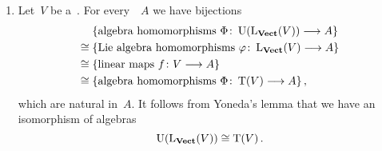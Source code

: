 \begin{example}
	\leavevmode
	\begin{enumerate}
		\item
			Let~$V$ be a~\vectorspace{$\kf$}.
			For every~\algebra{$\kf$}~$A$ we have bijections
			\begin{align*}
				{}&
				\{
					\text{algebra homomorphisms~$\Phi \colon \Univ(\freelievect(V)) \to A$}
				\}
				\\
				\cong{}&
				\{
					\text{Lie~algebra homomorphisms~$\varphi \colon \freelievect(V) \to A$}
				\}
				\\
				\cong{}&
				\{
					\text{linear maps~$f \colon V \to A$}
				\}
				\\
				\cong{}&
				\{
					\text{algebra homomorphisms~$\Phi \colon \Tensor(V) \to A$}
				\} \,,
			\end{align*}
			which are natural in~$A$.
			It follows from Yoneda’s lemma that we have an isomorphism of algebras
			\[
				\Univ(\freelievect(V)) \cong \Tensor(V) \,.
				\index{universal enveloping algebra!of the free Lie algebra!on a vector space}
			\]


\end{enumerate}
\end{example}
